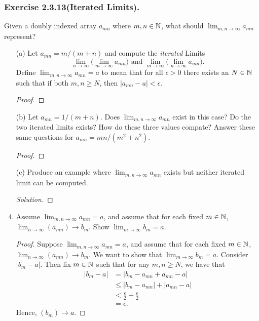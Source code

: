 \subsubsection{Exercise 2.3.13(Iterated Limits).} Given a doubly indexed array \( a_{mn}\) where \( m, n \in \mathbb{N} \), what should \(\lim_{m,n \to \infty} a_{mn}\) represent?  

\begin{enumerate}
    \item[(a)] Let \( a_{mn} = m / (m+n)\)  and compute the \textit{iterated} Limits
        \[ \lim_{n \to \infty } \Big( \lim_{m \to \infty} a_{mn} \Big) \text{ and } \lim_{m \to \infty } \Big( \lim_{n \to \infty} a_{mn} \Big).\]
        Define \(\lim_{m,n \to \infty} a_{mn} = a \) to mean that for all \( \epsilon > 0 \) there exists an \( N \in \mathbb{N} \) such that if both \( m,n \geq N \), then \( |a_{mn} - a | < \epsilon \).
        \begin{proof}
        
        \end{proof}
    \item[(b)] Let \( a_{mn} = 1/(m+n)\). Does \( \lim_{m,n \to \infty} a_{mn} \) exist in this case? Do the two iterated limits exists? How do these three values compate? Answer these same questions for \( a_{mn} = mn / (m^2 + n^2 )\). 
        \begin{proof}
        
        \end{proof}
    \item[(c)] Produce an example where \( \lim_{m,n \to \infty} a_{mn}\) exists but neither iterated limit can be computed. 
        \begin{proof}[Solution]
        
        \end{proof}
    \item Assume \( \lim_{m,n \to \infty} a_{mn} = a \), and assume that for each fixed \( m \in \mathbb{N} \), \( \lim_{n \to \infty} (a_{mn}) \to b_m \). Show \( \lim_{m \to \infty} b_m = a .\)
        \begin{proof}
            Suppose \( \lim_{m,n \to \infty} a_{mn} = a \), and assume that for each fixed \( m \in \mathbb{N} \), \( \lim_{n \to \infty } (a_{mn}) \to b_m \). We want to show that \( \lim_{m \to \infty } b_m = a \). Consider \( | b_m - a | \). Then fix \( m \in \mathbb{N} \) such that for any \( m,n \geq N \), we have that  
            \begin{align*}
                |b_m - a |&= |b_m - a_{mn} + a_{mn} - a | \\
                          &\leq |b_m - a_{mn}| + |a_{mn} - a | \\
                          &< \frac{\epsilon}{2} + \frac{\epsilon}{2} \\
                          &= \epsilon.
            \end{align*}
        Hence, \( (b_{m}) \to a \). 
        \end{proof}
\end{enumerate}










